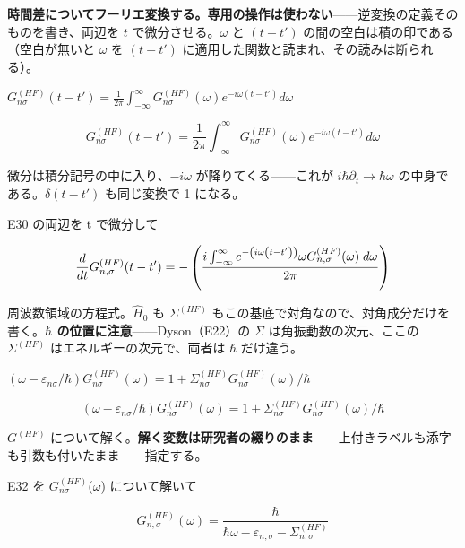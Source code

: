 \documentclass[dvipdfmx,a4paper,11pt]{jsarticle}
\begin{document}
\textbf{時間差についてフーリエ変換する。専用の操作は使わない}——逆変換の定義そのものを書き、両辺を $t$ で微分させる。$\omega$ と $(t-t')$ の間の空白は積の印である（空白が無いと $\omega$ を $(t-t')$ に適用した関数と読まれ、その読みは断られる）。

$G^{(HF)}_{n\sigma}(t-t') = \frac{1}{2\pi}\int_{-\infty}^{\infty} G^{(HF)}_{n\sigma}(\omega) e^{-i\omega (t-t')} d\omega$

\begin{equation}
  G^{(HF)}_{n\sigma}(t-t') = \frac{1}{2\pi}\int_{-\infty}^{\infty} G^{(HF)}_{n\sigma}(\omega) e^{-i\omega (t-t')} d\omega
  \label{eq:E30}
\end{equation}

微分は積分記号の中に入り、$-i\omega$ が降りてくる——これが $i\hbar\partial_t \to \hbar\omega$ の中身である。$\delta(t-t')$ も同じ変換で 1 になる。

E30 の両辺を t で微分して

\begin{equation}
  \frac{d}{d t} G^{(HF)}_{n,\sigma}(t-t')=-\left({{i \int_{-\infty }^{\infty }{e^ {- \left(i \omega \left(t-t'\right)\right) } \omega G^{(HF)}_{n,\sigma}(\omega)\;d\omega}}\over{2 \pi}}\right)
  \label{eq:E31}
\end{equation}

周波数領域の方程式。$\hat H_0$ も $\Sigma^{(HF)}$ もこの基底で対角なので、対角成分だけを書く。\textbf{$\hbar$ の位置に注意}——Dyson（E22）の $\Sigma$ は角振動数の次元、ここの $\Sigma^{(HF)}$ はエネルギーの次元で、両者は $\hbar$ だけ違う。

$(\omega - \varepsilon_{n\sigma}/\hbar) G^{(HF)}_{n\sigma}(\omega) = 1 + \Sigma^{(HF)}_{n\sigma} G^{(HF)}_{n\sigma}(\omega)/\hbar$

\begin{equation}
  (\omega - \varepsilon_{n\sigma}/\hbar) G^{(HF)}_{n\sigma}(\omega) = 1 + \Sigma^{(HF)}_{n\sigma} G^{(HF)}_{n\sigma}(\omega)/\hbar
  \label{eq:E32}
\end{equation}

$G^{(HF)}$ について解く。\textbf{解く変数は研究者の綴りのまま}——上付きラベルも添字も引数も付いたまま——指定する。

E32 を $G^{(HF)}_{n\sigma}$($\omega$) について解いて

\begin{equation}
  G^{(HF)}_{n,\sigma}(\omega) = \frac{\hbar}{\hbar \omega-\varepsilon_{n,\sigma}-\Sigma^{(HF)}_{n,\sigma}}
  \label{eq:E33}
\end{equation}
\end{document}
